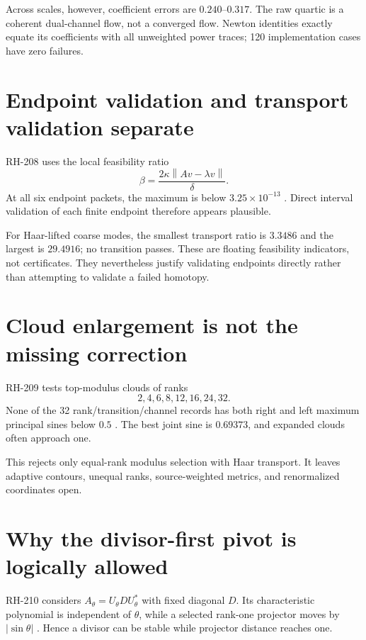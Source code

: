 \documentclass[12pt]{article}
\theoremstyle{remark}\newtheorem{remark}[theorem]{Remark}
\newcommand{\norm}[1]{\left\lVert#1\right\rVert}
\begin{document}
Across scales, however, coefficient errors are $0.240$--$0.317$.  The raw
quartic is a coherent dual-channel flow, not a converged flow.  Newton
identities exactly equate its coefficients with all unweighted power traces;
120 implementation cases have zero failures.

\section{Endpoint validation and transport validation separate}

RH-208 uses the local feasibility ratio
\begin{equation}\label{eq:beta}
 \beta=\frac{2\kappa\norm{Av-\lambda v}}{\delta}.
\end{equation}
At all six endpoint packets, the maximum is below
$3.25\times10^{-13}$ \citep{WangRH208}.  Direct interval validation of each
finite endpoint therefore appears plausible.

For Haar-lifted coarse modes, the smallest transport ratio is $3.3486$ and
the largest is $29.4916$; no transition passes.  These are floating
feasibility indicators, not certificates.  They nevertheless justify
validating endpoints directly rather than attempting to validate a failed
homotopy.

\section{Cloud enlargement is not the missing correction}

RH-209 tests top-modulus clouds of ranks
\begin{equation*}
 2,4,6,8,12,16,24,32.
\end{equation*}
None of the 32 rank/transition/channel records has both right and left
maximum principal sines below $0.5$ \citep{WangRH209}.  The best joint sine
is $0.69373$, and expanded clouds often approach one.

This rejects only equal-rank modulus selection with Haar transport.  It
leaves adaptive contours, unequal ranks, source-weighted metrics, and
renormalized coordinates open.

\section{Why the divisor-first pivot is logically allowed}

RH-210 considers $A_\theta=U_\theta DU_\theta^*$ with fixed diagonal $D$.
Its characteristic polynomial is independent of $\theta$, while a selected
rank-one projector moves by $|\sin\theta|$ \citep{WangRH210}.  Hence a divisor
can be stable while projector distance reaches one.
\end{document}
